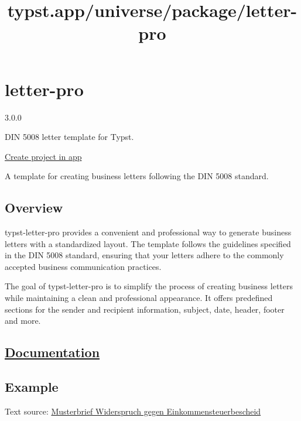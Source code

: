 \title{typst.app/universe/package/letter-pro}

\label{banner}
\label{template-thumbnail}

\section{letter-pro}\label{letter-pro}

{ 3.0.0 }

DIN 5008 letter template for Typst.

\href{/app?template=letter-pro&version=3.0.0}{Create project in app}

\label{readme}
A template for creating business letters following the DIN 5008
standard.

\subsection{Overview}\label{overview}

typst-letter-pro provides a convenient and professional way to generate
business letters with a standardized layout. The template follows the
guidelines specified in the DIN 5008 standard, ensuring that your
letters adhere to the commonly accepted business communication
practices.

The goal of typst-letter-pro is to simplify the process of creating
business letters while maintaining a clean and professional appearance.
It offers predefined sections for the sender and recipient information,
subject, date, header, footer and more.

\subsection{\texorpdfstring{\href{https://raw.githubusercontent.com/wiki/Sematre/typst-letter-pro/documentation-v3.0.0.pdf}{Documentation}}{Documentation}}\label{documentation}

\subsection{Example}\label{example}

Text source:
\href{https://web.archive.org/web/20230927152049/https://www.deutschepost.de/de/b/briefvorlagen/beschwerden.html\#Einspruch}{Musterbrief
Widerspruch gegen Einkommensteuerbescheid}

